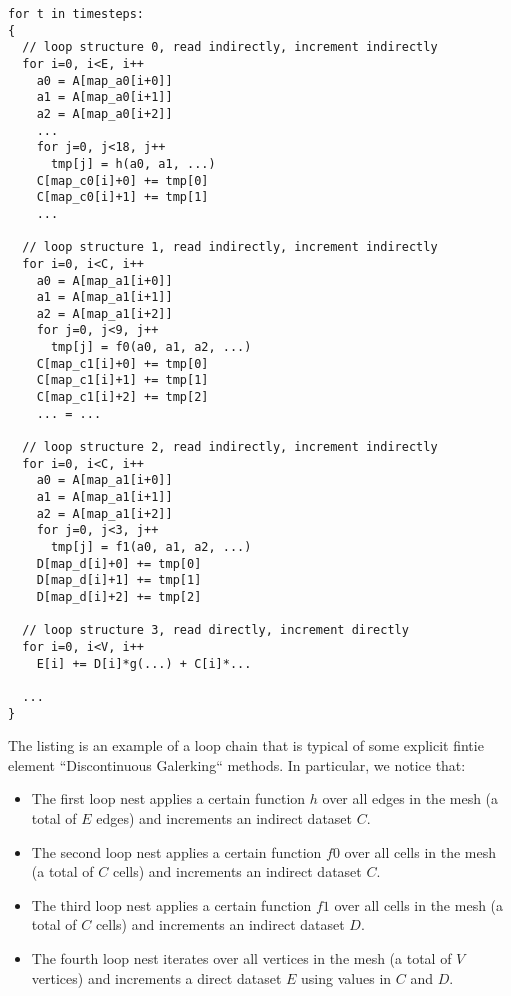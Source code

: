 \documentclass[a4paper]{article}
\begin{document}

\begin{footnotesize}
\begin{lstlisting}
for t in timesteps:
{
  // loop structure 0, read indirectly, increment indirectly
  for i=0, i<E, i++
    a0 = A[map_a0[i+0]]
    a1 = A[map_a0[i+1]]
    a2 = A[map_a0[i+2]]
    ...
    for j=0, j<18, j++
      tmp[j] = h(a0, a1, ...)
    C[map_c0[i]+0] += tmp[0]
    C[map_c0[i]+1] += tmp[1]
    ...

  // loop structure 1, read indirectly, increment indirectly
  for i=0, i<C, i++
    a0 = A[map_a1[i+0]]
    a1 = A[map_a1[i+1]]
    a2 = A[map_a1[i+2]]
    for j=0, j<9, j++
      tmp[j] = f0(a0, a1, a2, ...)
    C[map_c1[i]+0] += tmp[0]
    C[map_c1[i]+1] += tmp[1]
    C[map_c1[i]+2] += tmp[2]
    ... = ...

  // loop structure 2, read indirectly, increment indirectly
  for i=0, i<C, i++
    a0 = A[map_a1[i+0]]
    a1 = A[map_a1[i+1]]
    a2 = A[map_a1[i+2]]
    for j=0, j<3, j++
      tmp[j] = f1(a0, a1, a2, ...)
    D[map_d[i]+0] += tmp[0]
    D[map_d[i]+1] += tmp[1]
    D[map_d[i]+2] += tmp[2]
          
  // loop structure 3, read directly, increment directly
  for i=0, i<V, i++
    E[i] += D[i]*g(...) + C[i]*...

  ...
}
\end{lstlisting}
\end{footnotesize}

The listing is an example of a loop chain that is typical of some explicit fintie element ``Discontinuous Galerking`` methods. In particular, we notice that:
\begin{itemize}
\item The first loop nest applies a certain function $h$ over all edges in the mesh (a total of $E$ edges) and increments an indirect dataset $C$.
\item The second loop nest applies a certain function $f0$ over all cells in the mesh (a total of $C$ cells) and increments an indirect dataset $C$.
\item The third loop nest applies a certain function $f1$ over all cells in the mesh (a total of $C$ cells) and increments an indirect dataset $D$.
\item The fourth loop nest iterates over all vertices in the mesh (a total of $V$ vertices) and increments a direct dataset $E$ using values in $C$ and $D$.
\end{itemize}
\end{document}
